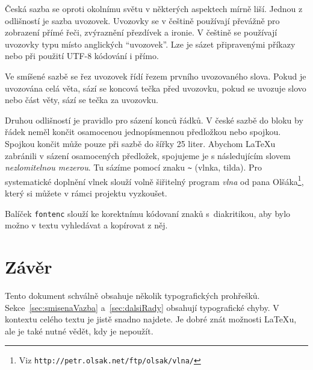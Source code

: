\documentclass[a4paper, 10pt, twocolumn]{article}
\begin{document}
    Česká sazba se oproti okolnímu světu v některých aspektech mírně liší. Jednou z odlišností je sazba uvozovek. Uvozovky se v češtině používají převážně pro zobrazení přímé řeči, zvýraznění přezdívek a ironie. V češtině se používají uvozovky typu  místo anglických \textquotedblleft{uvozovek}\textquotedblright. Lze je sázet připravenými příkazy nebo při použití UTF-8 kódování i přímo.

    Ve smíšené sazbě se řez uvozovek řídí řezem prvního uvozovaného slova. Pokud je uvozována celá věta, sází se koncová tečka před uvozovku, pokud se uvozuje slovo nebo část věty, sází se tečka za uvozovku.

    Druhou odlišností je pravidlo pro sázení konců řádků.
    V české sazbě do bloku by řádek neměl končit osamocenou jednopísmennou předložkou nebo spojkou. Spojkou  končit může pouze při sazbě do šířky 25 liter. Abychom {\LaTeX}u zabránili v sázení osamocených předložek, spojujeme je s následujícím slovem \emph{nezlomitelnou mezerou}. Tu sázíme pomocí znaku \verb|~| (vlnka, tilda). Pro systematické doplnění vlnek slouží volně šiřitelný program \emph{vlna} od pana Olšáka\footnote{Viz \texttt{http://petr.olsak.net/ftp/olsak/vlna/}}, který si můžete v rámci projektu vyzkoušet.
    
    Balíček \texttt{fontenc} slouží ke korektnímu kódovaní znaků s~diakritikou, aby bylo možno v textu vyhledávat a kopírovat z něj.
	
	\section{Závěr}
	Tento dokument schválně obsahuje několik typografických prohřešků. Sekce~\ref{sec:smisenaVazba} a~\ref{sec:dalsiRady} obsahují typografické chyby. V kontextu celého textu je jistě snadno najdete. Je dobré znát možnosti {\LaTeX}u, ale je také nutné vědět, kdy je nepoužít.
	
\end{document}
